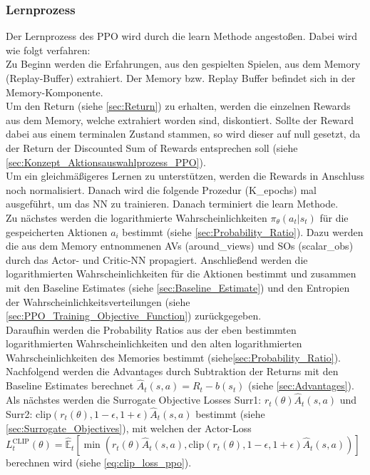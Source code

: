 \subsubsection{Lernprozess} \label{sec:Konzept_Lernprozess_PPO}
Der Lernprozess des PPO wird durch die learn Methode angestoßen. Dabei wird wie folgt verfahren:\\
Zu Beginn werden die Erfahrungen, aus den gespielten Spielen, aus dem Memory (Replay-Buffer) extrahiert. Der Memory bzw. Replay Buffer befindet sich in der Memory-Komponente.\\
Um den Return (siehe \ref{sec:Return}) zu erhalten, werden die einzelnen Rewards aus dem Memory, welche extrahiert worden sind, diskontiert. Sollte der Reward dabei aus einem terminalen Zustand stammen, so wird dieser auf null gesetzt, da der Return der Discounted Sum of Rewards entsprechen soll (siehe \ref{sec:Konzept_Aktionsauswahlprozess_PPO}).\\
Um ein gleichmäßigeres Lernen zu unterstützen, werden die Rewards in Anschluss noch normalisiert.
Danach wird die folgende Prozedur (K\_epochs) mal ausgeführt, um das NN zu trainieren. Danach terminiert die learn Methode.\\
Zu nächstes werden die logarithmierte Wahrscheinlichkeiten $\pi_{\theta}(a_{t}|s_{t})$ für die gespeicherten Aktionen $a_i$ bestimmt (siehe \ref{sec:Probability_Ratio}). Dazu werden die aus dem Memory entnommenen AVs (around\_views) und SOs (scalar\_obs) durch das Actor- und Critic-NN propagiert. Anschließend werden die logarithmierten Wahrscheinlichkeiten für die Aktionen bestimmt und zusammen mit den Baseline Estimates (siehe \ref{sec:Baseline_Estimate}) und den Entropien der Wahrscheinlichkeitsverteilungen (siehe \ref{sec:PPO_Training_Objective_Function}) zurückgegeben.\\
Daraufhin werden die Probability Ratios aus der eben bestimmten logarithmierten Wahrscheinlichkeiten und den alten logarithmierten Wahrscheinlichkeiten des Memories bestimmt (siehe\ref{sec:Probability_Ratio}).
Nachfolgend werden die Advantages durch Subtraktion der Returns mit den Baseline Estimates berechnet $\hat{A}_{t}(s, a) = R_{t} - b(s_{t})$ (siehe \ref{sec:Advantages}).\\
Als nächstes werden die Surrogate Objective Losses Surr1: $r_{t}(\theta) \hat{A}_{t}(s, a)$ und Surr2: $\text{clip}(r_{t}(\theta), 1 - \epsilon, 1 + \epsilon) \hat{A}_{t}(s, a)$ bestimmt (siehe \ref{sec:Surrogate_Objectives}), mit welchen der Actor-Loss $L^\text{CLIP}_{t} (\theta) = \mathbb{\hat{E}}_{t} [ \min(r_{t}(\theta) \hat{A}_{t}(s, a), \text{clip}(r_{t}(\theta), 1 - \epsilon, 1 + \epsilon) \hat{A}_{t}(s, a))]$ berechnen wird (siehe \ref{eq:clip_loss_ppo}).
